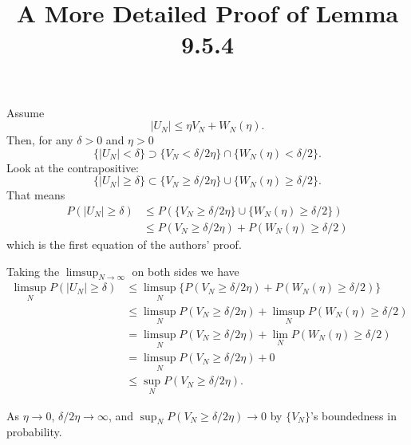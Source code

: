 \documentclass{article}
\title{A More Detailed Proof of Lemma 9.5.4}
\begin{document}
\maketitle

Assume
$$
|U_N| \le \eta V_N + W_N(\eta).
$$
Then, for any $\delta > 0$ and $\eta > 0$
\[
\{ |U_N| < \delta \} \supset \{ V_N < \delta/2\eta \}  \cap \{ W_N(\eta) < \delta/2\}.
\]
Look at the contrapositive:
\[
\{ |U_N| \ge \delta \} \subset \{ V_N \ge \delta/2\eta \}  \cup \{ W_N(\eta) \ge \delta/2\}.
\]
That means
\begin{align*}
P(|U_N| \ge \delta) &\le P(\{ V_N \ge \delta/2\eta \}  \cup \{ W_N(\eta) \ge \delta/2\}) \\
&\le P( V_N \ge \delta/2\eta ) + P( W_N(\eta) \ge \delta/2) \tag{sub-additivity}
\end{align*}
which is the first equation of the authors' proof. 
\newline


Taking the $\limsup_{N \to \infty}$ on both sides we have
\begin{align*}
\limsup_N P(|U_N| \ge \delta) &\le \limsup_N \{ P( V_N \ge \delta/2\eta ) + P( W_N(\eta) \ge \delta/2) \}\\
&\le \limsup_N P(V_N \ge \delta/2\eta) + \limsup_N P( W_N(\eta) \ge \delta/2 ) \tag{properties of sup} \\
&= \limsup_N P(V_N \ge \delta/2\eta) + \lim_N P( W_N(\eta) \ge \delta/2 ) \tag{assumption}\\
&= \limsup_N P(V_N \ge \delta/2\eta) + 0 \tag{assumption}\\
&\le \sup_N P(V_N \ge \delta/2\eta).
\end{align*}

As $\eta \to 0$, $\delta/ 2\eta \to \infty$, and $\sup_N P(V_N \ge \delta/2\eta) \to 0$ by $\{V_N\}$'s boundedness in probability.
\end{document}
